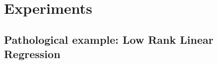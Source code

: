 \documentclass{article}
\theoremstyle{plain}
\theoremstyle{definition}
\theoremstyle{remark}
\theoremstyle{plain}
\begin{document}









\section{Experiments}


\subsection{Pathological example: Low Rank Linear Regression}
\label{sec:toy-example}
\end{document}

